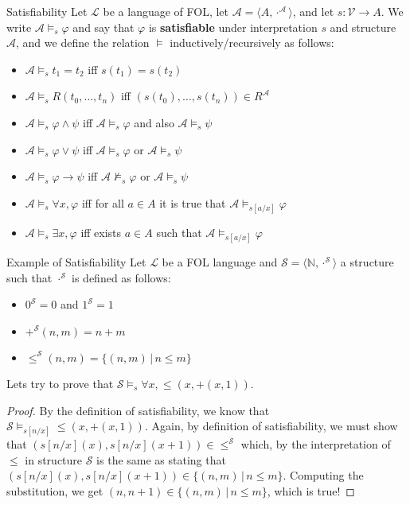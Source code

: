 \documentclass[aspectratio=169]{beamer}
\begin{document}
\begin{slide}{Satisfiability}
Let $\mathcal{L}$ be a language of FOL, let $\mathcal{A} = \langle A, \cdot^\mathcal{A} \rangle$, and let $s : \mathcal{V} \to A$. We write $\mathcal{A} \models_s \varphi$ and say that $\varphi$ is \textbf{satisfiable} under interpretation $s$ and structure $\mathcal{A}$, and we define the relation $\models$ inductively/recursively as follows:
\begin{itemize}
  \item $\mathcal{A} \models_s t_1 = t_2$ iff $s(t_1) = s(t_2)$
  \item $\mathcal{A} \models_s R(t_0,\ldots,t_n)$ iff $(s(t_0),\ldots,s(t_n)) \in R^\mathcal{A}$
  \item $\mathcal{A} \models_s \varphi \land \psi$ iff $\mathcal{A} \models_s \varphi$ and also $\mathcal{A} \models_s \psi$
  \item $\mathcal{A} \models_s \varphi \lor \psi$ iff $\mathcal{A} \models_s \varphi$ or $\mathcal{A} \models_s \psi$
  \item $\mathcal{A} \models_s \varphi \to \psi $ iff $\mathcal{A} \not\models_s \varphi$ or $\mathcal{A} \models_s \psi$
  \item $\mathcal{A} \models_s \forall x, \varphi$ iff for all $a \in A$ it is true that $\mathcal{A} \models_{s[a/x]} \varphi$
  \item $\mathcal{A} \models_s \exists x, \varphi$ iff exists $a \in A$ such that $\mathcal{A} \models_{s[a/x]} \varphi$
\end{itemize}
\end{slide}

\begin{slide}{Example of Satisfiability}
Let $\mathcal{L}$ be a FOL language and $\mathcal{S} = \langle \mathbb{N},\cdot^\mathcal{S} \rangle$ a structure such that $\cdot^\mathcal{S}$ is defined as follows:
\begin{itemize}
  \item $0^\mathcal{S} = 0$ and $1^\mathcal{S} = 1$
  \item $+^\mathcal{S}(n,m) = n + m$
  \item $\leq^\mathcal{S}(n,m) = \{ (n,m) \,|\, n \leq m \}$
\end{itemize}
Lets try to prove that $\mathcal{S} \models_s \forall x, \leq(x,+(x,1))$.
\begin{proof}
By the definition of satisfiability, we know that $\mathcal{S} \models_{s[n/x]} \leq(x,+(x,1))$. Again, by definition of satisfiability, we must show that $(s[n/x](x),s[n/x](x+1)) \in \leq^\mathcal{S}$ which, by the interpretation of $\leq$ in structure $\mathcal{S}$ is the same as stating that $(s[n/x](x),s[n/x](x+1)) \in \{ (n,m) \,|\, n \leq m \}$. Computing the substitution, we get $(n,n+1) \in \{ (n,m) \,|\, n \leq m \}$, which is true!
\end{proof}

\end{slide}
\end{document}
